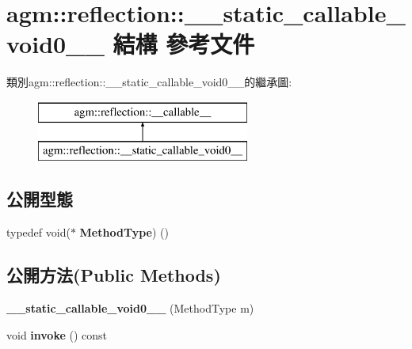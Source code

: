 \hypertarget{structagm_1_1reflection_1_1____static__callable__void0____}{}\section{agm\+:\+:reflection\+:\+:\+\_\+\+\_\+static\+\_\+callable\+\_\+void0\+\_\+\+\_\+ 結構 參考文件}
\label{structagm_1_1reflection_1_1____static__callable__void0____}
類別agm\+:\+:reflection\+:\+:\+\_\+\+\_\+static\+\_\+callable\+\_\+void0\+\_\+\+\_\+的繼承圖\+:\begin{figure}[H]
\begin{center}
\leavevmode
\includegraphics[height=2.000000cm]{structagm_1_1reflection_1_1____static__callable__void0____}
\end{center}
\end{figure}
\subsection*{公開型態}
\begin{DoxyCompactItemize}
\item 
typedef void($\ast$ {\bfseries Method\+Type}) ()\hypertarget{structagm_1_1reflection_1_1____static__callable__void0_____a4d6f6bcc9763c332b1b9d6c19cce9ddc}{}\label{structagm_1_1reflection_1_1____static__callable__void0_____a4d6f6bcc9763c332b1b9d6c19cce9ddc}

\end{DoxyCompactItemize}
\subsection*{公開方法(Public Methods)}
\begin{DoxyCompactItemize}
\item 
{\bfseries \+\_\+\+\_\+static\+\_\+callable\+\_\+void0\+\_\+\+\_\+} (Method\+Type m)\hypertarget{structagm_1_1reflection_1_1____static__callable__void0_____a0353db4bbab34ec53402da5e751ebadd}{}\label{structagm_1_1reflection_1_1____static__callable__void0_____a0353db4bbab34ec53402da5e751ebadd}

\item 
void {\bfseries invoke} () const \hypertarget{structagm_1_1reflection_1_1____static__callable__void0_____a167548500b53625d236b181c4bddfbdb}{}\label{structagm_1_1reflection_1_1____static__callable__void0_____a167548500b53625d236b181c4bddfbdb}

\end{DoxyCompactItemize}
